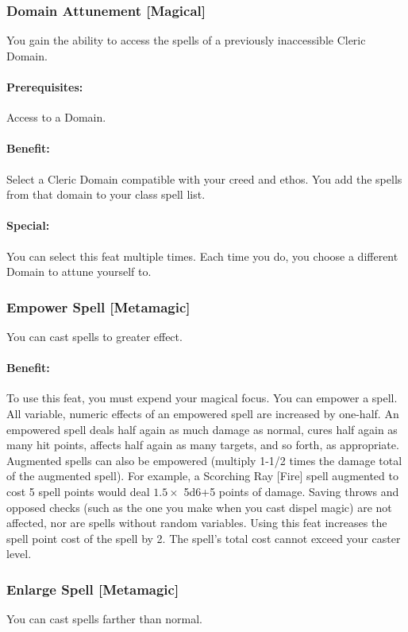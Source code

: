 \subsubsection[Domain Attunement]{Domain Attunement [Magical]}
\label{Feat:DomainAttunement}
You gain the ability to access the spells of a previously inaccessible Cleric Domain.
\paragraph{Prerequisites:} Access to a Domain.

\paragraph{Benefit:} Select a Cleric Domain compatible with your creed and ethos. You add the spells from that domain to your class spell list.

\paragraph{Special:} You can select this feat multiple times. Each time you do, you choose a different Domain to attune yourself to.
\subsubsection[Empower Spell]{Empower Spell [Metamagic]}
\label{Feat:EmpowerSpell}
You can cast spells to greater effect.

\paragraph{Benefit:} To use this feat, you must expend your magical focus.
You can empower a spell. All variable, numeric effects of an empowered spell are increased by one-half. 
An empowered spell deals half again as much damage as normal, 
cures half again as many hit points, affects half again as many targets, and so forth, as appropriate. 
Augmented spells can also be empowered (multiply 1-1/2 times the damage total of the augmented spell). 
For example, a Scorching Ray [Fire] spell augmented to cost 5 spell points would deal
$1.5 \times$ 5d6+5 points of damage.
Saving throws and opposed checks (such as the one you make when you cast dispel magic) are not affected, 
nor are spells without random variables.
Using this feat increases the spell point cost of the spell by 2. The spell's total cost cannot exceed your caster level.

\subsubsection[Enlarge Spell]{Enlarge Spell [Metamagic]}
\label{Feat:EnlargeSpell}
You can cast spells farther than normal.

